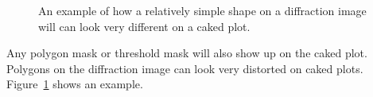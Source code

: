 \begin{figure}[htb]
    \centering
    \caption{An example of how a relatively simple
    shape on a diffraction image will can look very
    different on a caked plot.}
    \label{box_mask}
\end{figure}

Any polygon mask or threshold mask will also 
show up on the caked plot. Polygons on the 
diffraction image can look very distorted on 
caked plots. Figure~\ref{box_mask} shows an example.



